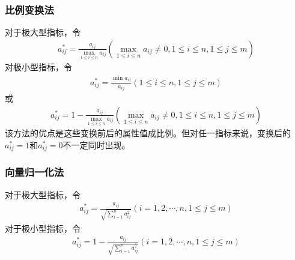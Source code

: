 \documentclass[letterpaper,10pt,english]{sphinxmanual}
\begin{document}
\subsubsection{比例变换法}
\label{\detokenize{docs/evaluation_model:id13}}
对于极大型指标，令
\begin{equation*}
\begin{split}
a_{i j}^{*}=\frac{a_{i j}}{\max _{1 \leq i \leq n} a_{i j}}\left(\max _{1 \leq i \leq n} a_{i j} \neq 0,1 \leq i \leq n, 1 \leq j \leq m\right)
\end{split}
\end{equation*}
对极小型指标，令
\begin{equation*}
\begin{split}
a_{i j}^{*}=\frac{\min a_{i j}}{a_{i j}}(1 \leq i \leq n, 1 \leq j \leq m)
\end{split}
\end{equation*}
或
\begin{equation*}
\begin{split}
a_{i j}^{*}=1-\frac{a_{i j}}{\max _{1 \leq i \leq n} a_{i j}}\left(\max _{1 \leq i \leq n} a_{i j} \neq 0,1 \leq i \leq n, 1 \leq j \leq m\right)
\end{split}
\end{equation*}
该方法的优点是这些变换前后的属性值成比例。但对任一指标来说，变换后的\(a_{i j}^{*} = 1\)和\(a_{i j}^{*}= 0\)不一定同时出现。


\subsubsection{向量归一化法}
\label{\detokenize{docs/evaluation_model:id14}}
对于极大型指标，令
\begin{equation*}
\begin{split}
a_{i j}^{*}=\frac{a_{i j}}{\sqrt{\sum_{i=1}^{n} a_{i j}^{2}}}(i=1,2, \cdots, n, 1 \leq j \leq m)
\end{split}
\end{equation*}
对于极小型指标，令
\begin{equation*}
\begin{split}
a_{i j}^{*}=1-\frac{a_{i j}}{\sqrt{\sum_{i=1}^{n} a_{i j}^{2}}}(i=1,2, \cdots, n, 1 \leq j \leq m)
\end{split}
\end{equation*}
\end{document}
